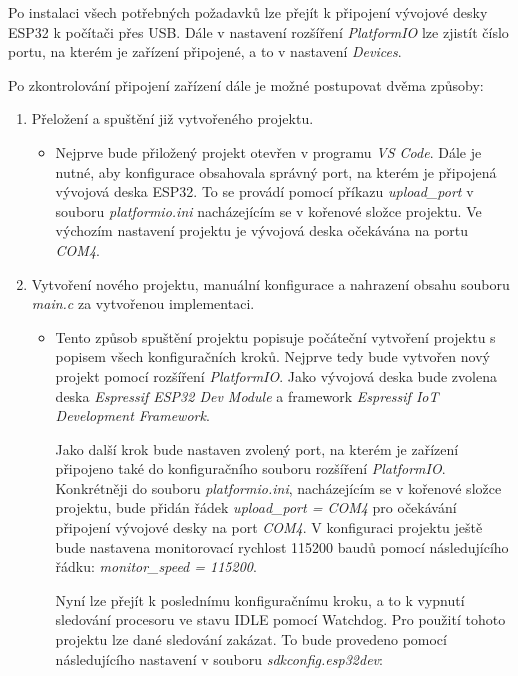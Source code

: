 \documentclass[a4paper, 12pt]{article}
\begin{document}
Po instalaci všech potřebných požadavků lze přejít k připojení vývojové desky ESP32 k počítači přes USB. Dále v nastavení rozšíření \textit{PlatformIO} lze zjistít číslo portu, na kterém je zařízení připojené, a to v nastavení \textit{Devices}.

Po zkontrolování připojení zařízení dále je možné postupovat dvěma způsoby:

\begin{enumerate}[label=(\alph*)]
    \item Přeložení a spuštění již vytvořeného projektu.

        \begin{itemize}
            \item Nejprve bude přiložený projekt otevřen v programu \textit{VS Code}. Dále je nutné, aby konfigurace obsahovala správný port, na kterém je připojená vývojová deska ESP32. To se provádí pomocí příkazu \textit{upload\_port} v souboru \textit{platformio.ini} nacházejícím se v kořenové složce projektu. Ve výchozím nastavení projektu je vývojová deska očekávána na portu \textit{COM4}.
        \end{itemize}
    
    \item Vytvoření nového projektu, manuální konfigurace a nahrazení obsahu souboru \textit{main.c} za vytvořenou implementaci.

        \begin{itemize}
            \item Tento způsob spuštění projektu popisuje počáteční vytvoření projektu s popisem všech konfiguračních kroků. Nejprve tedy bude vytvořen nový projekt pomocí rozšíření \textit{PlatformIO}. Jako vývojová deska bude zvolena deska \textit{Espressif ESP32 Dev Module} a framework \textit{Espressif IoT Development Framework}.

            Jako další krok bude nastaven zvolený port, na kterém je zařízení připojeno také do konfiguračního souboru rozšíření \textit{PlatformIO}. Konkrétněji do souboru \textit{platformio.ini}, nacházejícím se v kořenové složce projektu, bude přidán řádek \textit{upload\_port = COM4} pro očekávání připojení vývojové desky na port \textit{COM4}. V konfiguraci projektu ještě bude nastavena monitorovací rychlost 115200 baudů pomocí následujícího řádku: \textit{monitor\_speed = 115200}.
            
            Nyní lze přejít k poslednímu konfiguračnímu kroku, a to k vypnutí sledování procesoru ve stavu IDLE pomocí Watchdog. Pro použití tohoto projektu lze dané sledování zakázat. To bude provedeno pomocí následujícího nastavení v souboru \textit{sdkconfig.esp32dev}:
            

\end{itemize}
\end{enumerate}
\end{document}
